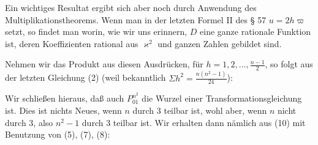
Ein wichtiges Resultat ergibt sich aber noch durch Anwendung des Multiplikationstheorems. Wenn man in der letzten Formel II des § 57 $u = 2h\varpi$ setzt, so findet man
worin, wie wir uns erinnern, $D$ eine ganze rationale Funktion ist, deren Koeffizienten rational aus $\varkappa^2$ und ganzen Zahlen gebildet sind.

Nehmen wir das Produkt aus diesen Ausdrücken, für $h = 1, 2, \ldots, \frac{n-1}{2}$, so folgt aus der letzten Gleichung (2) (weil bekanntlich $\Sigma h^2 = \frac{n(n^2-1)}{24}$):

Wir schließen hieraus, daß auch $P_{01}^{n^2}$ die Wurzel einer Transformationsgleichung ist. Dies ist nichts Neues, wenn $n$ durch 3 teilbar ist, wohl aber, wenn $n$ nicht durch 3, also $n^2 - 1$ durch 3 teilbar ist. Wir erhalten dann nämlich aus (10) mit Benutzung von (5), (7), (8):

